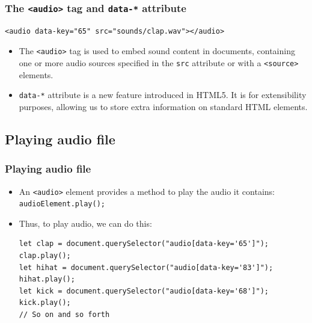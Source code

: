 \documentclass[handout,12pt]{beamer}
\begin{document}
\begin{frame}[fragile]
	\frametitle{The \texttt{<audio>} tag and \texttt{data-*} attribute}
	\begin{verbatim}
<audio data-key="65" src="sounds/clap.wav"></audio>
	\end{verbatim}
	\begin{itemize}
		\item The \texttt{<audio>} tag is used to embed sound content in documents, containing one or more audio sources specified in the \texttt{src} attribute or with a \texttt{<source>} elements.
		\item \texttt{data-*} attribute is a new feature introduced in HTML5. It is for extensibility purposes, allowing us to store extra information on standard HTML elements.
	\end{itemize}
\end{frame}

\subsection{Playing audio file}
\begin{frame}[fragile]
	\frametitle{Playing audio file}
	\begin{itemize}
		\item An \texttt{<audio>} element provides a method to play the audio it contains: \texttt{audioElement.play();}
		\item Thus, to play audio, we can do this:
		\begin{verbatim}
let clap = document.querySelector("audio[data-key='65']");
clap.play();
let hihat = document.querySelector("audio[data-key='83']");
hihat.play();
let kick = document.querySelector("audio[data-key='68']");
kick.play();
// So on and so forth
		\end{verbatim}
	\end{itemize}
\end{frame}
\end{document}
